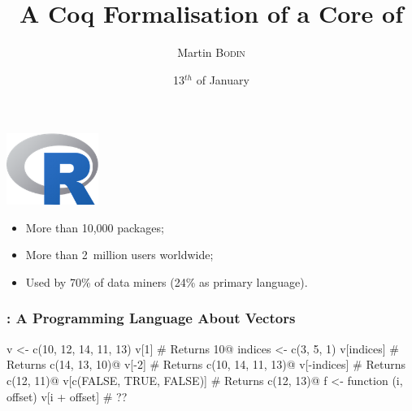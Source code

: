 \documentclass{beamer}
\title{A Coq Formalisation of a Core of \R{}}
\author{Martin \textsc{Bodin}}
\institute{CMM}
\date{13\(^{th}\) of January}
\begin{document}
\begin{frame}
    \titlepage
\end{frame}

\section{\R{}}

\begin{frame}
    \begin{center}
        \includegraphics[width=3cm]{images/Rlogo.png}
    \end{center}

    \vfill

    \begin{itemize}
        \item More than 10,000 packages;
        \item More than 2~million users worldwide;
        \item Used by 70\% of data miners (24\% as primary language).
    \end{itemize}
\end{frame}


\begin{frame}[fragile]
    \frametitle{\R{}: A Programming Language About Vectors}

\begin{Rcode}
v <- c(10, 12, 14, 11, 13)
v[1]                          # Returns 10@\pause@
indices <- c(3, 5, 1)
v[indices]                    # Returns c(14, 13, 10)@\pause@
v[-2]                         # Returns c(10, 14, 11, 13)@\pause@
v[-indices]                   # Returns c(12, 11)@\pause@
v[c(FALSE, TRUE, FALSE)]      # Returns c(12, 13)@\pause@
f <- function (i, offset)
       v[i + offset]          # ??
\end{Rcode}

\end{frame}
\end{document}
